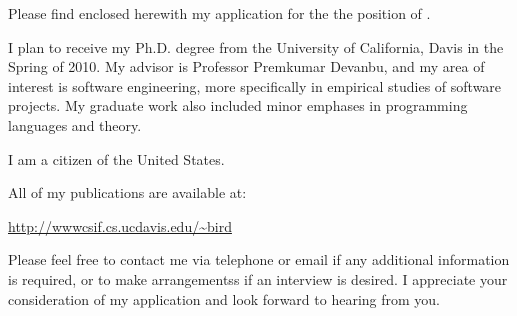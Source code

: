 \documentclass[12pt]{newlfm}
\begin{document}

\begin{newlfm} 

Please find enclosed herewith my application for the the position of
\@jobposition 
\@joblocation.

I plan to receive my Ph.D. degree from the University of California, Davis in
the Spring of 2010.  My advisor is Professor Premkumar Devanbu, and my area of
interest is software engineering, more specifically in empirical studies of
software projects.  My graduate work also included minor emphases in 
programming languages and theory.

I am a citizen of the United States.

\@enclosedtext

All of my publications are available at:

{\small \url{http://wwwcsif.cs.ucdavis.edu/~bird}}

Please feel free to contact me via telephone or email if any additional
information is required, or to make arrangementss if an interview is desired.
I appreciate your consideration of my application and look forward to hearing from
you.

\end{newlfm} 
\end{document}
